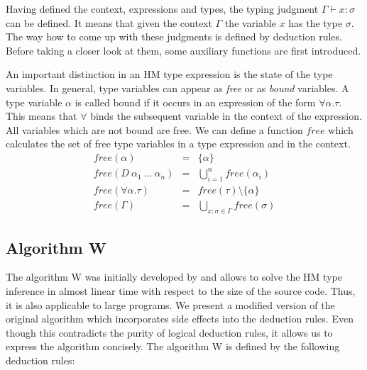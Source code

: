 Having defined the context, expressions and types, the typing judgment $\Gamma \vdash x : \sigma$ can be defined.
It means that given the context $\Gamma$ the variable $x$ has the type $\sigma$.
The way how to come up with these judgments is defined by deduction rules.
Before taking a closer look at them, some auxiliary functions are first introduced.

An important distinction in an HM type expression is the state of the type variables.
In general, type variables can appear as \emph{free} or as \emph{bound} variables.
A type variable $\alpha$ is called bound if it occurs in an expression of the form $\forall \alpha. \tau$.
This means that $\forall$ binds the subsequent variable in the context of the expression.
All variables which are not bound are free.
We can define a function $free$ which calculates the set of free type variables in a type expression and in the context.
\begin{eqnarray*}
free(\alpha) &=& \{\alpha\}\\
free(D\ \alpha_1\ \ldots\ \alpha_n) &=& \bigcup_{i=1}^n free(\alpha_i)\\
free(\forall \alpha. \tau) &=& free(\tau) \setminus \{\alpha\}\\
free(\Gamma) &=& \bigcup_{x:\sigma \in \Gamma} free(\sigma)
\end{eqnarray*}

\subsection{Algorithm W}

The algorithm W was initially developed by \textcite{damas:1982a} and allows to solve the HM type inference in almost linear time with respect to the size of the source code.
Thus, it is also applicable to large programs.
We present a modified version of the original algorithm which incorporates side effects into the deduction rules.
Even though this contradicts the purity of logical deduction rules, it allows us to express the algorithm concisely.
The algorithm W is defined by the following deduction rules:

\begin{prooftree}
\end{prooftree}

\begin{prooftree}
\end{prooftree}

